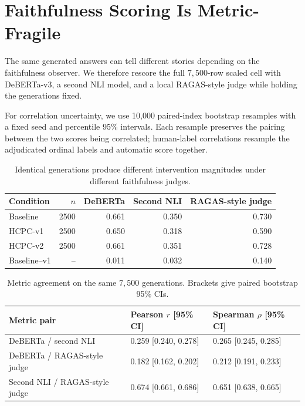 \section{Faithfulness Scoring Is Metric-Fragile}
\label{sec:metric_fragility}

The same generated answers can tell different stories depending on the
faithfulness observer. We therefore rescore the full \(7{,}500\)-row scaled
cell with DeBERTa-v3, a second NLI model, and a local RAGAS-style judge while
holding the generations fixed.

For correlation uncertainty, we use 10,000 paired-index bootstrap resamples
with a fixed seed and percentile 95\% intervals. Each resample preserves the
pairing between the two scores being correlated; human-label correlations
resample the adjudicated ordinal labels and automatic score together.

\begin{table}[H]
\centering
\small
\caption{Identical generations produce different intervention magnitudes under
different faithfulness judges.}
\label{tab:metrics}
\begin{tabular}{lrrrr}
\toprule
Condition & \(n\) & DeBERTa & Second NLI & RAGAS-style judge \\
\midrule
Baseline & 2500 & 0.661 & 0.350 & 0.730 \\
HCPC-v1 & 2500 & 0.650 & 0.318 & 0.590 \\
HCPC-v2 & 2500 & 0.661 & 0.351 & 0.728 \\
\midrule
Baseline--v1 & -- & 0.011 & 0.032 & 0.140 \\
\bottomrule
\end{tabular}
\end{table}

\begin{table}[H]
\centering
\scriptsize
\caption{Metric agreement on the same \(7{,}500\) generations. Brackets give
paired bootstrap 95\% CIs.}
\label{tab:metric_corr}
\begin{tabular}{lll}
\toprule
Metric pair & Pearson \(r\) [95\% CI] & Spearman \(\rho\) [95\% CI] \\
\midrule
DeBERTa / second NLI & 0.259 [0.240, 0.278] & 0.265 [0.245, 0.285] \\
DeBERTa / RAGAS-style judge & 0.182 [0.162, 0.202] & 0.212 [0.191, 0.233] \\
Second NLI / RAGAS-style judge & 0.674 [0.661, 0.686] & 0.651 [0.638, 0.665] \\
\bottomrule
\end{tabular}
\end{table}


